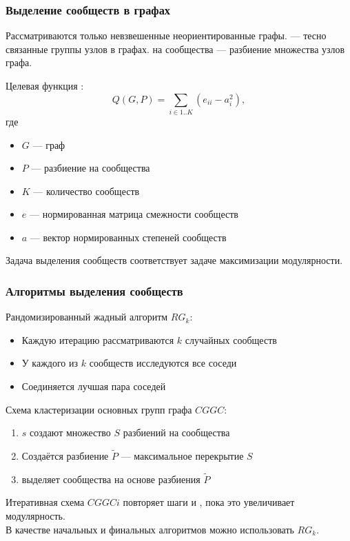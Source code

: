 \begin{frame}
	\frametitle{Выделение сообществ в графах}
	Рассматриваются только невзвешенные неориентированные графы.
	 --- тесно связанные группы узлов в графах.
	 на сообщества --- разбиение множества узлов графа.\vspace{1em}

	Целевая функция :
	$$Q(G, P) = \sum_{i \in 1..K}{\left(e_{ii} - a_i^2\right)},$$
	где
	\begin{itemize} 
		\item $G$ --- граф
		\item $P$ --- разбиение на сообщества
		\item $K$ --- количество сообществ
		\item $e$ --- нормированная матрица смежности сообществ
		\item $a$ --- вектор нормированных степеней сообществ
	\end{itemize}

	Задача выделения сообществ соответствует задаче максимизации модулярности.
\end{frame}


\begin{frame}
	\frametitle{Алгоритмы выделения сообществ}

	Рандомизированный жадный алгоритм $RG_k$:
	\begin{itemize}
		\item Каждую итерацию рассматриваются $k$ случайных сообществ
		\item У каждого из $k$ сообществ исследуются все соседи
		\item Соединяется лучшая пара соседей
	\end{itemize}\vspace{0.5em}

	Схема кластеризации основных групп графа $CGGC$:
	\begin{enumerate}
		\item $s$  создают множество $S$ разбиений на сообщества
		\item Создаётся разбиение $\widetilde{P}$ --- максимальное перекрытие $S$
		\item {} выделяет сообщества на основе разбиения $\widetilde{P}$
	\end{enumerate}

	Итеративная схема $CGGCi$ повторяет шаги  и , пока это увеличивает модулярность.\\
	В качестве начальных и финальных алгоритмов можно использовать $RG_k$.
\end{frame}


